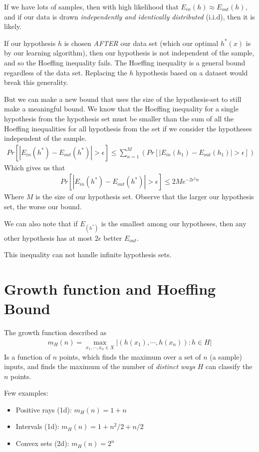 \documentclass{article}
\begin{document}
  If we have lots of samples, then with high likelihood that $E_{in}(h) \approx E_{out}(h)$, and if our data is drawn \emph{independently and identically distributed} (i.i.d), then it is likely.
  
  If our hypothesis $h$ is chosen \emph{AFTER} our data set (which our optimal $h^*(x)$ is by our learning algorithm), then our hypothesis is not independent of the sample, and so the Hoeffing inequality fails. 
  The Hoeffing inequality is a general bound regardless of the data set. Replacing the $h$ hypothesis based on a dataset would break this generality. 

  But we can make a new bound that uses the size of the hypothesis-set to still make a meaningful bound.
  We know that the Hoeffing inequality for a single hypothesis from the hypothesis set must be smaller than the sum of all the Hoeffing inequalities for all hypothesis from the set if we consider the hypotheses independent of the sample.
  \begin{align}
    Pr[|E_{in}(h^*)-E_{out}(h^*)|\gt \epsilon] \leq \sum_{n=1}^M (Pr[|E_{in}(h_1)-E_{out}(h_1)|\gt \epsilon])
  \end{align}
  Which gives us that 
  \begin{align}
    Pr[|E_{in}(h^*) - E_{out}(h^*)| > \epsilon] \leq 2Me^{-2 \epsilon^2n} 
  \end{align}
  Where $M$ is the size of our hypothesis set. Observe that the larger our hypothesis set, the worse our bound.

  We can also note that if $E_(h^*)$ is the smallest among our hypotheses, then any other hypothesis has at most $2\epsilon$ better $E_{out}$. 

  This inequality can not handle infinite hypothesis sets.


\section{Growth function and Hoeffing Bound}
  The growth function described as 
  \begin{align}
    m_H(n) = \max_{x_1, \cdots, x_n \in X} |{
      (h(x_1), \cdots, h(x_n)) : h \in H
    }|
  \end{align}
  Is a function of $n$ points, which finds the maximum over a set of $n$ (a sample) inputs, and finds the maximum of the number of \emph{distinct ways} $H$ can classify the $n$ points.

  Few examples:
  \begin{itemize}
    \item Positive rays (1d): $m_H(n) = 1+n$
    \item Intervals (1d): $m_H(n) = 1 + n^2 / 2+n/2$
    \item Convex sets (2d): $m_H(n) = 2^n$
  \end{itemize}
\end{document}
